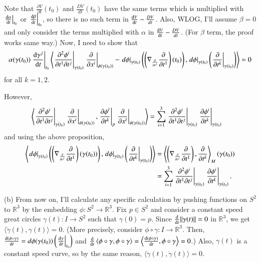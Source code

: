\documentclass[a4paper, 12pt]{article}
\theoremstyle{Mydefinition}
\theoremstyle{Mytheorem}
\begin{document}
Note that $\frac{\partial V}{\partial t} (t_0)$ and $\frac{DV}{dt}(t_0)$ have the same terms which is multiplied with $\left.\dv{\alpha}{t}\right|_{t_0}$ or $\left.\dv{\beta}{t}\right|_{t_0}$, so there is no such term in $\dv{V}{t}-\frac{DV}{dt}$. Also, WLOG, I'll assume $\beta = 0$ and only consider the terms multiplied with $\alpha$ in $\dv{V}{t}-\frac{DV}{dt}$. (For $\beta$ term, the proof works same way.) Now, I need to show that
\begin{equation*}
    \alpha(\gamma(t_0))\left.\dv{\gamma^j}{t}\right|_{t_0} \left\langle \left.\frac{\partial^2\phi^i}{\partial t^1 \partial t^j}\right|_{\gamma(t_0)}\left.\pdv{x^i}\right|_{\phi(\gamma(t_0))} - \left.d\phi\right|_{\gamma(t_0)} \left( \left(\nabla_{\pdv{t^j}}\pdv{t^1}\right)(t_0)\right), \left.d\phi\right|_{\gamma(t_0)} \left(\left.\pdv{t^k}\right|_{\gamma(t_0)}\right)\right\rangle = 0
\end{equation*}
for all $k=1,2$.

However,
\begin{equation*}
    \begin{split}
        \left\langle \left.\frac{\partial^2\phi^i}{\partial t^1 \partial t^j}\right|_{\gamma(t_0)}\left.\pdv{x^i}\right|_{\phi(\gamma(t_0))}, \left.\pdv{\phi^l}{t^k}\right|_{p}\left.\pdv{x^l}\right|_{\phi(\gamma(t_0))}\right\rangle&= \sum_{i=1}^3 \left.\frac{\partial^2\phi^i}{\partial t^1 \partial t^j}\right|_{\gamma(t_0)}\left.\pdv{\phi^i}{t^k}\right|_{\gamma(t_0)}
    \end{split}
\end{equation*}
and using the above proposition,
\begin{equation*}
    \begin{split}
       \left\langle \left.d\phi\right|_{\gamma(t_0)} \left( \left(\nabla_{\pdv{t^j}}\pdv{t^1}\right)(\gamma(t_0))\right), \left.d\phi\right|_{\gamma(t_0)} \left(\left.\pdv{t^k}\right|_{\gamma(t_0)}\right)\right\rangle&= \left\langle \left(\nabla_{\pdv{t^j}}\pdv{t^1}\right), \pdv{t^k}\right\rangle_M(\gamma(t_0)) \\
       &=\sum_{i=1}^3 \left.\frac{\partial^2\phi^i}{\partial t^1 \partial t^j}\right|_{\gamma(t_0)}\left.\pdv{\phi^i}{t^k}\right|_{\gamma(t_0)}.
    \end{split}
\end{equation*}

(b) From now on, I'll calculate any specific calculation by pushing functions on $S^2$ to $\mathbb{R}^3$ by the embedding $\phi:S^2\rightarrow \mathbb{R}^3$. Fix $p\in S^2$ and consider a constant speed great circles $\gamma(t):I\rightarrow S^2$ such that $\gamma(0) = p$. Since $\dv{t}\norm{\gamma(t)} = 0$ in $\mathbb{R}^3$, we get $\langle\dot{\gamma}(t), \gamma(t)\rangle = 0$. (More precisely, consider $\phi\circ \gamma:I\rightarrow \mathbb{R}^3$. Then, $\dv{(\phi\circ \gamma)}{t}(t_0) = d\phi(\gamma(t_0))\left(\left.\dv{\gamma}{t}\right|_{t_0}\right)$ and $\dv{t}\left\langle \phi\circ \gamma, \phi\circ \gamma\right\rangle = \left\langle \dv{(\phi\circ \gamma)}{t}, \phi\circ \gamma\right\rangle = 0$.) Also, $\gamma(t)$ is a constant speed curve, so by the same reason, $\langle\ddot{\gamma}(t), \dot{\gamma}(t)\rangle = 0$.
\end{document}

